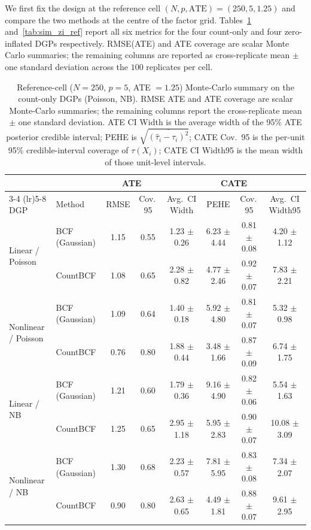 \documentclass[11pt]{article}
\theoremstyle{plain}
\theoremstyle{definition}
\theoremstyle{remark}
\begin{document}
We first fix the design at the reference cell
$(N, p, \mathrm{ATE}) = (250, 5, 1.25)$ and compare the two methods
at the centre of the factor grid. Tables~\ref{tab:sim_count_ref}
and~\ref{tab:sim_zi_ref} report all six metrics for the four
count-only and four zero-inflated DGPs respectively. RMSE(ATE) and
ATE coverage are scalar Monte Carlo summaries; the remaining columns
are reported as cross-replicate mean $\pm$ one standard deviation
across the $100$ replicates per cell.

\begin{table}[h!]\footnotesize
\caption{Reference-cell ($N = 250$, $p = 5$, ATE $= 1.25$) Monte-Carlo summary on the count-only DGPs (Poisson, NB). RMSE ATE and ATE coverage are scalar Monte-Carlo summaries; the remaining columns report the cross-replicate mean $\pm$ one standard deviation. ATE CI Width is the average width of the 95\% ATE posterior credible interval; PEHE is $\sqrt{\overline{(\hat\tau_i - \tau_i)^2}}$; CATE Cov.~95 is the per-unit 95\% credible-interval coverage of $\tau(X_i)$; CATE CI Width95 is the mean width of those unit-level intervals.}\label{tab:sim_count_ref}
\centering
\begin{tabular*}{\linewidth}{ @{\extracolsep{\fill}} ll cc cccc @{}}
\toprule
 &  & \multicolumn{2}{c}{ATE} & \multicolumn{4}{c}{CATE} \\
\cmidrule(lr){3-4} \cmidrule(lr){5-8}
DGP & Method & RMSE & Cov.\,95 & Avg.\ CI Width & PEHE & Cov.\,95 & Avg.\ CI Width95 \\
\midrule
\multirow{2}{*}{Linear / Poisson} & BCF (Gaussian) & 1.15 & 0.55 & 1.23 $\pm$ 0.26 & 6.23 $\pm$ 4.44 & 0.81 $\pm$ 0.08 & 4.20 $\pm$ 1.12 \\
 & CountBCF & 1.08 & 0.65 & 2.28 $\pm$ 0.82 & 4.77 $\pm$ 2.46 & 0.92 $\pm$ 0.07 & 7.83 $\pm$ 2.21 \\
\midrule
\multirow{2}{*}{Nonlinear / Poisson} & BCF (Gaussian) & 1.09 & 0.64 & 1.40 $\pm$ 0.18 & 5.92 $\pm$ 4.80 & 0.81 $\pm$ 0.07 & 5.32 $\pm$ 0.98 \\
 & CountBCF & 0.76 & 0.80 & 1.88 $\pm$ 0.44 & 3.48 $\pm$ 1.66 & 0.87 $\pm$ 0.09 & 6.74 $\pm$ 1.75 \\
\midrule
\multirow{2}{*}{Linear / NB} & BCF (Gaussian) & 1.21 & 0.60 & 1.79 $\pm$ 0.36 & 9.16 $\pm$ 4.90 & 0.82 $\pm$ 0.06 & 5.54 $\pm$ 1.63 \\
 & CountBCF & 1.25 & 0.65 & 2.95 $\pm$ 1.18 & 5.95 $\pm$ 2.83 & 0.90 $\pm$ 0.07 & 10.08 $\pm$ 3.09 \\
\midrule
\multirow{2}{*}{Nonlinear / NB} & BCF (Gaussian) & 1.30 & 0.68 & 2.23 $\pm$ 0.57 & 7.81 $\pm$ 5.95 & 0.83 $\pm$ 0.08 & 7.34 $\pm$ 2.07 \\
 & CountBCF & 0.90 & 0.80 & 2.63 $\pm$ 0.65 & 4.49 $\pm$ 1.81 & 0.88 $\pm$ 0.07 & 9.61 $\pm$ 2.95 \\
\bottomrule
\end{tabular*}
\end{table}
\end{document}
